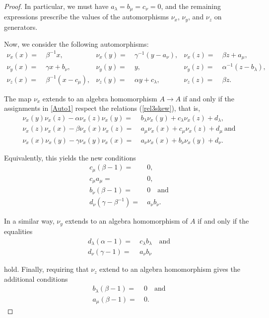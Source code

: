 \documentclass{amsart}
\theoremstyle{definition}
\theoremstyle{remark}
\numberwithin{equation}{section}
\begin{document}
\begin{proof}
In particular, we must have $a_{\lambda}=b_{\mu}=c_{\nu}=0$, and the remaining expressions prescribe the values of the automorphisms $\nu_x$, $\nu_y$, and $\nu_z$ on generators.

Now, we consider the following automorphisms:
\begin{align}
   \nu_{x}(x) = &\ \beta^{-1}x, & \nu_{x}(y) = &\ \gamma^{-1}(y-a_{\nu}), & \nu_{x}(z) = &\ \beta z+a_{\mu}, \label{Auto1} \\ 
    \nu_{y}(x) = &\ \gamma x+b_{\nu}, & \nu_{y}(y) = &\ y, &  \nu_{y}(z) = &\ \alpha^{-1}(z-b_{\lambda}), \label{Auto2} \\
    \nu_{z}(x) = &\ \beta^{-1}(x-c_{\mu}), & \nu_{z}(y) = &\ \alpha y+c_{\lambda}, & \nu_{z}(z) = &\ \beta z. \label{Auto3}
\end{align}

The map $\nu_{x}$ extends to an algebra homomorphism $A\to A$ if and only if the assignments in \eqref{Auto1} respect the relations {\rm (}\ref{rel3skew}{\rm )}, that is,
\begin{align*}
    \nu_{x}(y)\nu_{x}(z)-\alpha\nu_{x}(z)\nu_{x}(y) = &\ b_{\lambda}\nu_{x}(y) + c_{\lambda}\nu_{x}(z)+d_{\lambda}, \\
   \nu_{x}(z)\nu_{x}(x)-\beta\nu_{x}(x)\nu_{x}(z) = &\ a_{\mu}\nu_{x}(x) + c_{\mu}\nu_{x}(z)+d_{\mu} \ \text{and} \\
   \nu_{x}(x)\nu_{x}(y)-\gamma\nu_{x}(y)\nu_{x}(x) = &\ a_{\nu}\nu_{x}(x) + b_{\nu}\nu_{x}(y)+d_{\nu}.
\end{align*}

Equivalently, this yields the new conditions
\begin{align*}
     c_{\mu}(\beta-1) = &\ 0,  \\
     c_{\mu}a_{\mu}= &\ 0, \\
     b_{\nu}(\beta-1)= &\ 0 \quad \text{and} \\
     d_{\nu}(\gamma-\beta^{-1}) = &\ a_{\nu}b_{\nu}.
\end{align*}

In a similar way, $\nu_{y}$ extends to an algebra homomorphism of $A$ if and only if the equalities
\begin{align*}
     d_{\lambda}(\alpha-1) = &\ c_{\lambda}b_{\lambda} \quad \text{and} \\
     d_{\nu}(\gamma-1) = &\ a_{\nu}b_{\nu}
\end{align*}

hold. Finally, requiring that $\nu_{z}$ extend to an algebra homomorphism gives the additional conditions
\begin{align*}
    b_{\lambda}(\beta-1) = &\ 0 \quad \text{and}\\
    a_{\mu}(\beta-1) = &\ 0.
\end{align*}


\end{proof}
\end{document}
